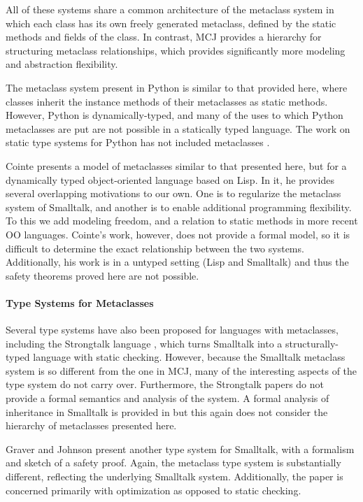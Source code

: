\documentclass[10pt]{acm-sigplan}
\begin{document}
All of these systems share a common architecture of the metaclass system
in which each class has its own freely generated metaclass, defined by
the static methods and fields of the class.  In contrast, MCJ
provides a hierarchy for structuring metaclass relationships, which
provides significantly more modeling and abstraction flexibility.

The metaclass system present in Python \cite{PythonMeta} is
similar to that provided here, where classes inherit the instance methods
of their metaclasses as static methods.  However,
Python is dynamically-typed, and many of the uses to which Python
metaclasses are put are not possible in a statically typed language.
The work on static type systems for Python has not included
metaclasses \cite{Starkiller}.

Cointe \cite{objvlisp} presents a model of metaclasses
similar to that presented here, but for a dynamically typed object-oriented
language based on Lisp.  In it, he provides several
overlapping motivations to our own.  One is to regularize the
metaclass system of Smalltalk, and another is to enable additional
programming flexibility.  To this we add modeling freedom, and a
relation to static methods in more recent OO languages.  Cointe's
work, however, does not provide a formal model, so it is difficult to
determine the exact relationship between the two systems.  Additionally,
his work is in a untyped setting (Lisp and Smalltalk) and thus the
safety theorems proved here are not possible. 

\paragraph{Type Systems for Metaclasses}
Several type systems have also been proposed for languages with
metaclasses, including the Strongtalk language \cite{Strongtalk},
which turns Smalltalk into a structurally-typed language with
static checking.  However, because the Small\-talk metaclass
system is so different from the one in MCJ, many of the interesting
aspects of the type system do not carry over.  Furthermore, the
Strongtalk papers do not provide a formal semantics and analysis of
the system.  A formal analysis of inheritance in Smalltalk is provided
in \cite{cook:thesis} but this again does not consider the hierarchy
of metaclasses presented here.

Graver and Johnson \cite{graver:90} present another type system for
Smalltalk, with a formalism and sketch of a safety proof.  Again, the
metaclass type system is substantially different, reflecting the
underlying Smalltalk system.  Additionally, the paper is concerned
primarily with optimization as opposed to static checking.
\end{document}
